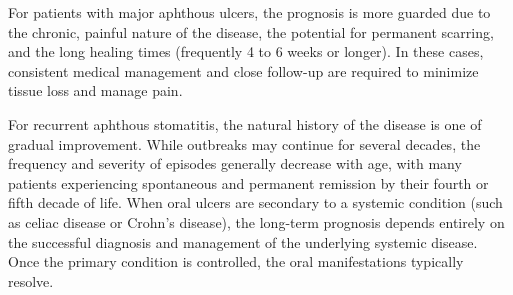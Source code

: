 For patients with major aphthous ulcers, the prognosis is more guarded due to the chronic, painful nature of the disease, the potential for permanent scarring, and the long healing times (frequently 4 to 6 weeks or longer). In these cases, consistent medical management and close follow-up are required to minimize tissue loss and manage pain.

For recurrent aphthous stomatitis, the natural history of the disease is one of gradual improvement. While outbreaks may continue for several decades, the frequency and severity of episodes generally decrease with age, with many patients experiencing spontaneous and permanent remission by their fourth or fifth decade of life. When oral ulcers are secondary to a systemic condition (such as celiac disease or Crohn's disease), the long-term prognosis depends entirely on the successful diagnosis and management of the underlying systemic disease. Once the primary condition is controlled, the oral manifestations typically resolve.

